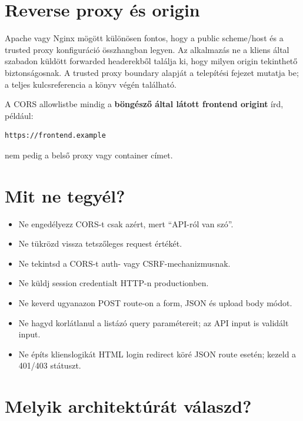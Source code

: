 \section{Reverse proxy és origin}

Apache vagy Nginx mögött különösen fontos, hogy a public scheme/host és a trusted proxy konfiguráció összhangban legyen. Az alkalmazás ne a kliens által szabadon küldött forwarded headerekből találja ki, hogy milyen origin tekinthető biztonságosnak. A trusted proxy boundary alapját a telepítési fejezet mutatja be; a teljes  kulcsreferencia a könyv végén található.

A CORS allowlistbe mindig a \textbf{böngésző által látott frontend origint} írd, például:

\begin{lstlisting}
https://frontend.example
\end{lstlisting}

nem pedig a belső proxy vagy container címet.

\section{Mit ne tegyél?}

\begin{itemize}
  \item Ne engedélyezz CORS-t csak azért, mert ``API-ról van szó''.
  \item Ne tükrözd vissza tetszőleges request  értékét.
  \item Ne tekintsd a CORS-t auth- vagy CSRF-mechanizmusnak.
  \item Ne küldj session credentialt HTTP-n productionben.
  \item Ne keverd ugyanazon POST route-on a form, JSON és upload body módot.
  \item Ne hagyd korlátlanul a listázó query paramétereit; az API input is validált input.
  \item Ne építs klienslogikát HTML login redirect köré JSON route esetén; kezeld a 401/403 státuszt.
\end{itemize}

\section{Melyik architektúrát válaszd?}

